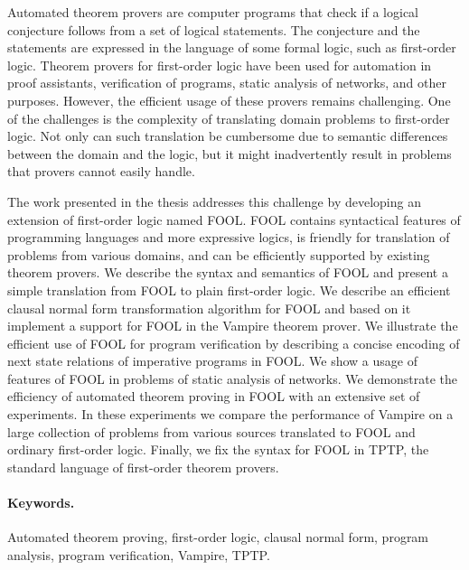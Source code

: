 Automated theorem provers are computer programs that check if a logical conjecture follows from a set of logical statements. The conjecture and the statements are expressed in the language of some formal logic, such as first-order logic. Theorem provers for first-order logic have been used for automation in proof assistants, verification of programs, static analysis of networks, and other purposes. However, the efficient usage of these provers remains challenging. One of the challenges is the complexity of translating domain problems to first-order logic. Not only can such translation be cumbersome due to semantic differences between the domain and the logic, but it might inadvertently result in problems that provers cannot easily handle.

The work presented in the thesis addresses this challenge by developing an extension of first-order logic named FOOL. FOOL contains syntactical features of programming languages and more expressive logics, is friendly for translation of problems from various domains, and can be efficiently supported by existing theorem provers. We describe the syntax and semantics of FOOL and present a simple translation from FOOL to plain first-order logic. We describe an efficient clausal normal form transformation algorithm for FOOL and based on it implement a support for FOOL in the Vampire theorem prover. We illustrate the efficient use of FOOL for program verification by describing a concise encoding of next state relations of imperative programs in FOOL. We show a usage of features of FOOL in problems of static analysis of networks. We demonstrate the efficiency of automated theorem proving in FOOL with an extensive set of experiments. In these experiments we compare the performance of Vampire on a large collection of problems from various sources translated to FOOL and ordinary first-order logic. Finally, we fix the syntax for FOOL in TPTP, the standard language of first-order theorem provers.

\vfill

\paragraph{Keywords.} Automated theorem proving, first-order logic, clausal normal form, program analysis, program verification, Vampire, TPTP.